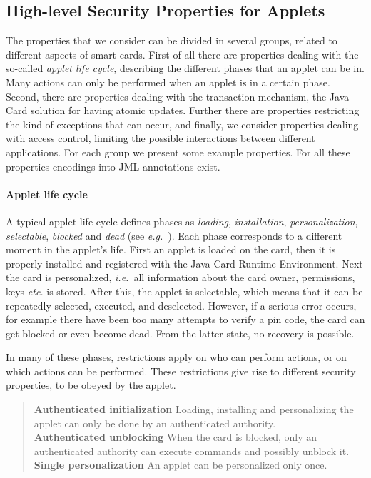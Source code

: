 \subsection{High-level Security Properties for Applets}
\label{SecHighLevelSecProp}

The properties that we consider can be divided in several groups,
related to different aspects of smart cards. First of all there are
properties dealing with the so-called \emph{applet life cycle},
describing the different phases that an applet can be in. Many actions
can only be performed when an applet is in a certain phase. Second,
there are properties dealing with the transaction mechanism, the Java
Card solution for having atomic updates. Further there are properties
restricting the kind of exceptions that can occur, and finally, we
consider properties dealing with access control, limiting the possible
interactions between different applications. For each group we present
some example properties. For all these properties encodings into JML
annotations exist.

\paragraph {Applet life cycle}

A typical applet life cycle defines phases as {\it loading},
{\it installation}, {\it personalization}, {\it selectable},
{\it blocked} and {\it dead}
(see \emph{e.g.}~\/\cite{MarletLM01}).  Each phase corresponds to a
different moment in the applet's life. First an applet is loaded on
the card, then it is properly installed and registered with the Java
Card Runtime Environment. Next the card is personalized,
\emph{i.e.}~all information about the card owner, permissions, keys
\emph{etc.} is stored. After this, the applet is selectable, which means
that it can be repeatedly selected, executed, and deselected. However,
if a serious error occurs, for example there
have been too many attempts to verify a pin code, the card can get
blocked or even become dead. From the latter state, no recovery is
possible.

In many of these phases, restrictions apply on who can perform
actions, or on which actions can be performed. These restrictions give
rise to different security properties, to be obeyed by the applet.

\begin{quote}
\textbf{Authenticated initialization} Loading, installing and 
personalizing the applet can only be done by an authenticated
authority.\smallskip\\
\textbf{Authenticated unblocking} When the card is blocked,
only an authenticated authority can execute commands and possibly
unblock it.\smallskip\\
\textbf{Single personalization} An applet can be
personalized only once.
\end{quote}


